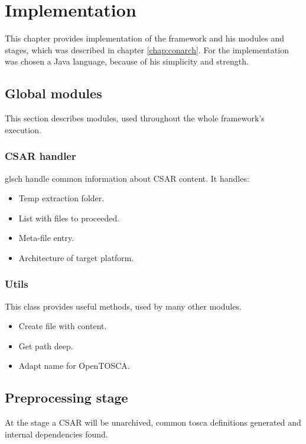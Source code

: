 
\chapter{Implementation}\label{chap:imp}
This chapter provides implementation of the framework and his modules and stages, which was described in chapter \ref{chap:conarch}.
For the implementation was chosen a Java language, because of his simplicity and strength. 

\section{Global modules}
This section describes modules, used throughout the whole framework's execution.

\subsection{CSAR handler}
gls{ch} handle common information about CSAR content.
It handles:
\begin{itemize}
	\item Temp extraction folder.
	\item List with files to proceeded.
	\item Meta-file entry.
	\item Architecture of target platform.
\end{itemize}

\subsection{Utils}
This class provides useful methods, used by many other modules.
\begin{itemize}
	\item Create file with content.
	\item Get path deep.
	\item Adapt name for OpenTOSCA.
\end{itemize}

\section{Preprocessing stage}
At the  stage a CSAR will be unarchived, common \gls{tosca} definitions generated and internal dependencies found. 

